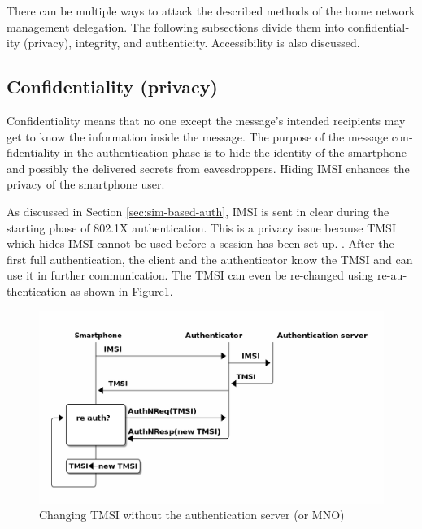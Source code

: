 \documentclass[12pt,a4paper,english]{tutthesis}
\begin{document}
\begin{otherlanguage}{english}
There can be multiple ways to attack the described methods of
the home network management delegation. The following subsections divide them into
confidentiality (privacy), integrity, and
authenticity. Accessibility is also discussed.
\subsection{Confidentiality (privacy)}
\label{sec-6-1-1}

Confidentiality means that no one except the message's intended
recipients may get to know the information inside the message.
The purpose of the message confidentiality in the authentication phase is
to hide the identity of the smartphone and possibly the delivered
secrets from eavesdroppers. Hiding IMSI enhances the privacy of the smartphone user. 


As discussed in Section \ref{sec:sim-based-auth},  IMSI is sent in clear 
during the starting phase of 802.1X authentication. This is a privacy 
issue because TMSI which hides IMSI cannot be used before a session
has been set up. \cite[p.66]{rfc4186}.
After the first full authentication, the client and the authenticator 
know the TMSI and can use it in further communication. 
The TMSI can even be re-changed using re-authentication as shown in Figure\ref{fig:tmsi}.

\begin{figure}[htb]
\centering
\includegraphics[width=.9\linewidth]{imsi-tmsi.png}
\caption{\label{fig:tmsi}Changing TMSI without the authentication server (or MNO)}
\end{figure}





\end{otherlanguage}
\end{document}
